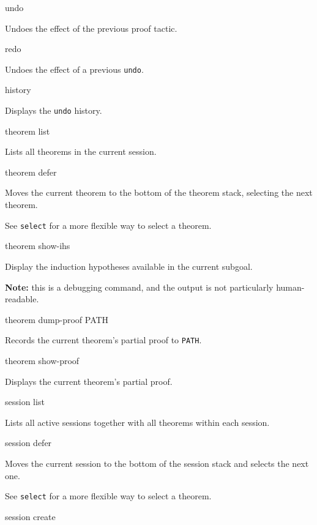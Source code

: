 \begin{description}
\item{\ttfamily undo}

Undoes the effect of the previous proof tactic.

\item{\ttfamily redo}

Undoes the effect of a previous \texttt{undo}.

\item{\ttfamily history}


Displays the \texttt{undo} history.

\item{\ttfamily theorem list}

Lists all theorems in the current session.

\item{\ttfamily theorem defer}

Moves the current theorem to the bottom of the theorem stack, selecting the next
theorem.

See \texttt{select} for a more flexible way to select a theorem.

\item{\ttfamily theorem show-ihs}


Display the induction hypotheses available in the current subgoal.

\textbf{Note:} this is a debugging command, and the output is not particularly
human-readable.

\item{\ttfamily theorem dump-proof PATH}

Records the current theorem's partial proof to \texttt{PATH}.

\item{\ttfamily theorem show-proof}

Displays the current theorem's partial proof.

\item{\ttfamily session list}

Lists all active sessions together with all theorems within each session.

\item{\ttfamily session defer}

Moves the current session to the bottom of the session stack and selects the
next one.

See \texttt{select} for a more flexible way to select a theorem.

\item{\ttfamily session create}


\end{description}
